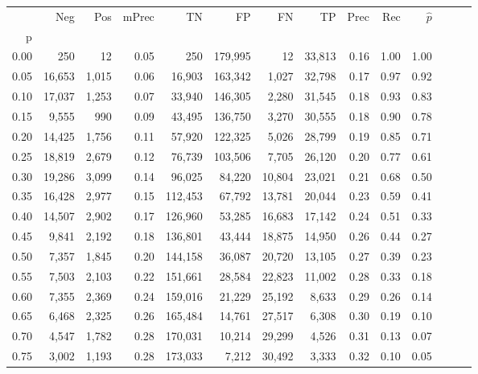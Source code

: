 \begin{tabular}{rrrrrrrrrrrrrr}
\toprule
{} &     Neg &    Pos & mPrec &       TN &       FP &      FN &      TP &  Prec &   Rec & $\hat{p}$ \\
p    &         &        &       &          &          &         &         &       &       &           \\
\midrule
0.00 &     250 &     12 &  0.05 &      250 &  179,995 &      12 &  33,813 &  0.16 &  1.00 &      1.00 \\
0.05 &  16,653 &  1,015 &  0.06 &   16,903 &  163,342 &   1,027 &  32,798 &  0.17 &  0.97 &      0.92 \\
0.10 &  17,037 &  1,253 &  0.07 &   33,940 &  146,305 &   2,280 &  31,545 &  0.18 &  0.93 &      0.83 \\
0.15 &   9,555 &    990 &  0.09 &   43,495 &  136,750 &   3,270 &  30,555 &  0.18 &  0.90 &      0.78 \\
0.20 &  14,425 &  1,756 &  0.11 &   57,920 &  122,325 &   5,026 &  28,799 &  0.19 &  0.85 &      0.71 \\
0.25 &  18,819 &  2,679 &  0.12 &   76,739 &  103,506 &   7,705 &  26,120 &  0.20 &  0.77 &      0.61 \\
0.30 &  19,286 &  3,099 &  0.14 &   96,025 &   84,220 &  10,804 &  23,021 &  0.21 &  0.68 &      0.50 \\
0.35 &  16,428 &  2,977 &  0.15 &  112,453 &   67,792 &  13,781 &  20,044 &  0.23 &  0.59 &      0.41 \\
0.40 &  14,507 &  2,902 &  0.17 &  126,960 &   53,285 &  16,683 &  17,142 &  0.24 &  0.51 &      0.33 \\
0.45 &   9,841 &  2,192 &  0.18 &  136,801 &   43,444 &  18,875 &  14,950 &  0.26 &  0.44 &      0.27 \\
0.50 &   7,357 &  1,845 &  0.20 &  144,158 &   36,087 &  20,720 &  13,105 &  0.27 &  0.39 &      0.23 \\
0.55 &   7,503 &  2,103 &  0.22 &  151,661 &   28,584 &  22,823 &  11,002 &  0.28 &  0.33 &      0.18 \\
0.60 &   7,355 &  2,369 &  0.24 &  159,016 &   21,229 &  25,192 &   8,633 &  0.29 &  0.26 &      0.14 \\
0.65 &   6,468 &  2,325 &  0.26 &  165,484 &   14,761 &  27,517 &   6,308 &  0.30 &  0.19 &      0.10 \\
0.70 &   4,547 &  1,782 &  0.28 &  170,031 &   10,214 &  29,299 &   4,526 &  0.31 &  0.13 &      0.07 \\
0.75 &   3,002 &  1,193 &  0.28 &  173,033 &    7,212 &  30,492 &   3,333 &  0.32 &  0.10 &      0.05 \\

\end{tabular}
